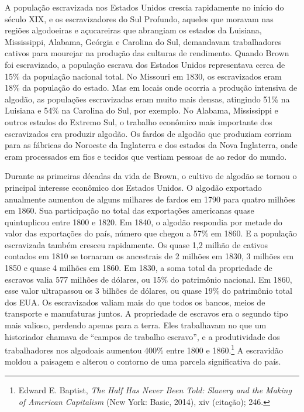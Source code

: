 A população escravizada nos Estados Unidos crescia rapidamente no início
do século XIX, e os escravizadores do Sul Profundo, aqueles que moravam
nas regiões algodoeiras e açucareiras que abrangiam os estados da
Luisiana, Mississippi, Alabama, Geórgia e Carolina do Sul, demandavam
trabalhadores cativos para mourejar na produção das culturas de
rendimento. Quando Brown foi escravizado, a população escrava dos
Estados Unidos representava cerca de 15\% da população nacional total.
No Missouri em 1830, os escravizados eram 18\% da população do estado.
Mas em locais onde ocorria a produção intensiva de algodão, as
populações escravizadas eram muito mais densas, atingindo 51\% na
Luisiana e 54\% na Carolina do Sul, por exemplo. No Alabama, Mississippi
e outros estados do Extremo Sul, o trabalho econômico mais importante
dos escravizados era produzir algodão. Os fardos de algodão que
produziam corriam para as fábricas do Noroeste da Inglaterra e dos
estados da Nova Inglaterra, onde eram processados em fios e tecidos que
vestiam pessoas de ao redor do mundo.

Durante as primeiras décadas da vida de Brown, o cultivo de algodão se
tornou o principal interesse econômico dos Estados Unidos. O algodão
exportado anualmente aumentou de alguns milhares de fardos em 1790 para
quatro milhões em 1860. Sua participação no total das exportações
americanas quase quintuplicou entre 1800 e 1820. Em 1840, o algodão
respondia por metade do valor das exportações do país, número que chegou
a 57\% em 1860. E a população escravizada também cresceu rapidamente. Os
quase 1,2 milhão de cativos contados em 1810 se tornaram os ancestrais
de 2 milhões em 1830, 3 milhões em 1850 e quase 4 milhões em 1860.
Em 1830, a soma total da
propriedade de escravos valia 577 milhões de dólares, ou 15\% do
patrimônio nacional. Em 1860, esse valor ultrapassou os 3 bilhões de
dólares, ou quase 19\% do patrimônio total dos EUA.
Os escravizados valiam mais do que
todos os bancos, meios de transporte e manufaturas juntos. A propriedade
de escravos era o segundo tipo mais valioso, perdendo apenas para a
terra. Eles trabalhavam no que um historiador chamava de ``campos de
trabalho escravo'', e a produtividade dos trabalhadores nos algodoais
aumentou 400\% entre 1800 e 1860.\footnote{Edward E. Baptist, \emph{The
  Half Has Never Been Told: Slavery and the Making of American
  Capitalism} (New York: Basic, 2014), xiv (citação); 246.} A escravidão
moldou a paisagem e alterou o contorno de uma parcela significativa do
país.


